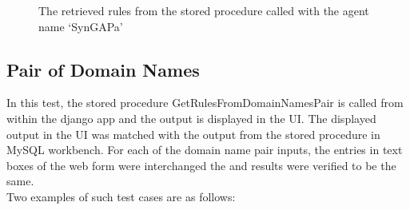 \documentclass[msc,deptreport,ai]{infthesis}      %
\begin{document}
\begin{enumerate}
\begin{figure}[H]
		\caption{The retrieved rules from the stored procedure called with the agent name `SynGAPa'}
		\label{fig:CorrectnessAgentName2}		
	\end{figure}	
\end{enumerate}


\subsection{Pair of Domain Names}
In this test, the stored procedure GetRulesFromDomainNamesPair is called from within the django app and the output is displayed in the UI. The displayed output in the UI was matched with the output from the stored procedure in MySQL workbench. For each of the domain name pair inputs, the entries in text boxes of the web form were interchanged the and results were verified to be the same.\\ Two examples of such test cases are as follows:
\end{document}
